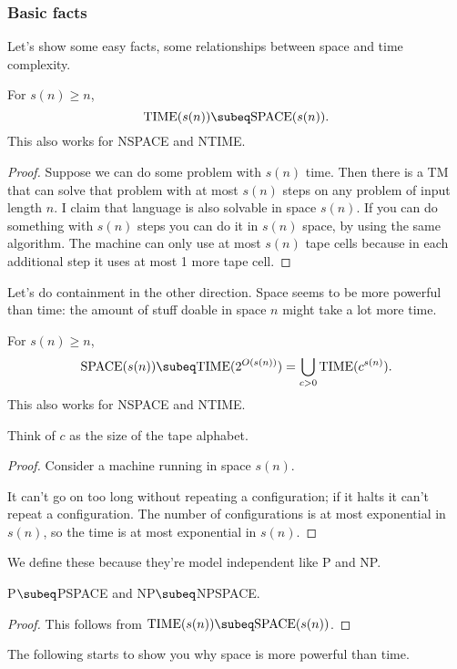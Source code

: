 \subsubsection{Basic facts}

Let's show some easy facts, some relationships between space and time complexity. 
\begin{pr}
For $s(n)\ge n$,
\[
\text{TIME}(s(n))\subeq \text{SPACE}(s(n)).
\]
This also works for NSPACE and NTIME.
\end{pr}
\begin{proof}
Suppose we can do some problem with $s(n)$ time. Then there is a TM that can solve that problem with at most $s(n)$ steps on any problem of input length $n$. I claim that language is also solvable in space $s(n)$. If you can do something with $s(n)$ steps you can do it in $s(n)$ space, by using the same algorithm. The machine can only use at most $s(n)$ tape cells because in each additional step it uses at most 1 more tape cell. %
\end{proof}
Let's do containment in the other direction. Space seems to be more powerful than time: the amount of stuff doable in space $n$ might take a lot more time.
\begin{pr}
For $s(n)\ge n$,
\[
\text{SPACE}(s(n))\subeq \text{TIME}(2^{O(s(n))})
=\bigcup_{c>0}\text{TIME}(c^{s(n)}).
\]
This also works for NSPACE and NTIME.
\end{pr}
Think of $c$ as the size of the tape alphabet.
\begin{proof}
Consider a machine running in space $s(n)$.

It can't go on too long without repeating a configuration; if it halts it can't repeat a configuration. The number of configurations is at most exponential in $s(n)$, so the time is at most exponential in $s(n)$.
\end{proof}
We define these because they're model independent like P and NP.
\begin{cor}
P$\subeq$PSPACE and 
NP$\subeq$NPSPACE.
\end{cor}
\begin{proof}
This follows from $\text{TIME}(s(n))\subeq \text{SPACE}(s(n))$.
\end{proof}
The following starts to show you why space is more powerful than time.

